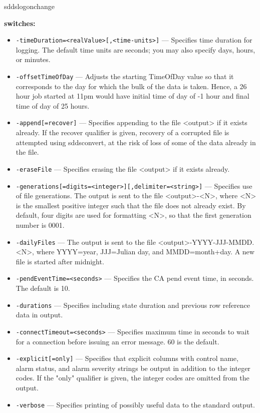 \begin{sddsprog}{sddslogonchange}
\item \textbf{switches:}
\begin{itemize}
  \item {\tt -timeDuration=<realValue>[,<time-units>]} --- Specifies time duration for logging.  The default time units are seconds; you may also specify days, hours, or minutes.
  \item {\tt -offsetTimeOfDay} --- Adjusts the starting TimeOfDay value so that it corresponds to the day for which the bulk of the data is taken.  Hence, a 26 hour job started at 11pm would have initial time of day of -1 hour and final time of day of 25 hours.
  \item {\tt -append[=recover]} --- Specifies appending to the file <output> if it exists already. If the recover qualifier is given, recovery of a corrupted file is attempted using sddsconvert, at the risk of loss of some of the data already in the file.
  \item {\tt -eraseFile} --- Specifies erasing the file <output> if it exists already.
  \item {\tt -generations[=digits=<integer>][,delimiter=<string>]} --- Specifies use of file generations.  The output is sent to the file <output>-<N>, where <N> is the smallest positive integer such that the file does not already exist.   By default, four digits are used for formatting <N>, so that the first generation number is 0001.
  \item {\tt -dailyFiles} --- The output is sent to the file <output>-YYYY-JJJ-MMDD.<N>, where YYYY=year, JJJ=Julian day, and MMDD=month+day.  A new file is started after midnight.
  \item {\tt -pendEventTime=<seconds>} --- Specifies the CA pend event time, in seconds.  The default is 10.
  \item {\tt -durations} --- Specifies including state duration and previous row reference data in output.
  \item {\tt -connectTimeout=<seconds>} --- Specifies maximum time in seconds to wait for a connection before issuing an error message. 60 is the default.
  \item {\tt -explicit[=only]} --- Specifies that explicit columns with control name, alarm status, and alarm severity strings be output in addition to the integer codes.  If the "only" qualifier is given, the integer codes are omitted from the output.
  \item {\tt -verbose} --- Specifies printing of possibly useful data to the standard output.

\end{itemize}
\end{sddsprog}
